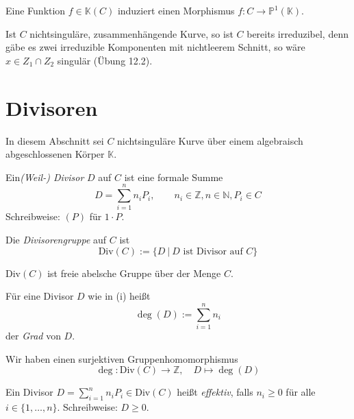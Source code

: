 \documentclass[11pt]{book}
\theoremstyle{nonumberbreak}
\newenvironment{defin}[1][]{\ifthenelse{\equal{#1}{}}{\definition}{\definition[#1]}\rm}{\enddefinition}
\newenvironment{folg}[1][]{\ifthenelse{\equal{#1}{}}{\folger}{\folger[#1]}\rm}{\endfolger}
\begin{document}
\begin{spacing}{1.3}
\begin{folg} %

\begin{compactenum}
\item Eine Funktion $f \in \mathbb{K}(C)$ induziert einen Morphismus $f: C \longrightarrow \mathbb{P}^1(\mathbb{K})$.
\item Ist $C$ nichtsinguläre, zusammenhängende Kurve, so ist $C$ bereits irreduzibel, denn gäbe es zwei irreduzible Komponenten mit nichtleerem Schnitt, so wäre $x \in Z_1 \cap Z_2$ singulär (Übung 12.2).
\end{compactenum}
\end{folg}


\newcommand{\ordp}{\textrm{ord}_P}
\newcommand{\Pn}{\mathbb{P}^n(\mathbb{K})}
\newcommand{\Pone}{\mathbb{P}^1(\mathbb{K})}
\newcommand{\Aone}{\mathbb{A}^1(\mathbb{K})}
\newcommand{\An}{\mathbb{A}^n(\mathbb{K})}




\renewcommand*\thesection{§ \arabic{section}\quad}
\section{Divisoren} %
\renewcommand*\thesection{\arabic{section}}

In diesem Abschnitt sei $C$ nichtsinguläre Kurve über einem algebraisch abgeschlossenen Körper $\mathbb{K}$.


\begin{defin} %

\begin{compactenum}
\item Ein\textit{(Weil-) Divisor} $D$ auf $C$ ist eine formale Summe
$$D= \sum_{i=1}^n n_i P_i, \qquad n_i \in \mathbb{Z}, n \in \mathbb{N}, P_i \in C$$
Schreibweise: $(P)$ für $1 \cdot P$.
\item Die \textit{Divisorengruppe} auf $C$ ist 
$$\textrm{Div}(C):= \{ D \ \vert \ D \textrm{ ist Divisor auf } C \}$$
\item $\textrm{Div}(C)$ ist freie abelsche Gruppe über der Menge $C$.
\item Für eine Divisor $D$ wie in (i) heißt
$$\deg(D) := \sum_{i=1}^n n_i$$
der \textit{Grad} von $D$.
\item Wir haben einen surjektiven Gruppenhomomorphismus
$$\deg: \textrm{Div}(C) \longrightarrow \mathbb{Z}, \quad D \mapsto \deg(D)$$
\item Ein Divisor $D= \sum_{i=1}^n n_i P_i \in \textrm{Div}(C)$ heißt \textit{effektiv}, falls $n_i \geqslant 0$ für alle $i \in \{1, \ldots, n \}$. Schreibweise: $D \geqslant 0$. 
	

\end{compactenum}
\end{defin}
\end{spacing}
\end{document}
